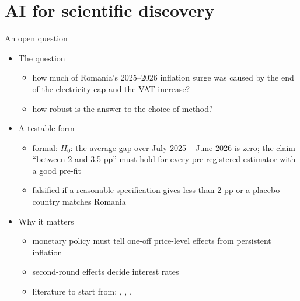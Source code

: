 \section{AI for scientific discovery}

\begin{frame}{An open question}
\itemsize{\small}
\begin{itemize}
    \item The question
    \begin{itemize}
        \item how much of Romania's 2025--2026 inflation surge was caused by the end of the electricity cap and the VAT increase?
        \item how robust is the answer to the choice of method?
    \end{itemize}
    \item A testable form
    \begin{itemize}
        \item formal: $H_0$: the average gap over July 2025 -- June 2026 is zero; the claim ``between 2 and 3.5 pp'' must hold for every pre-registered estimator with a good pre-fit
        \item falsified if a reasonable specification gives less than 2 pp or a placebo country matches Romania
    \end{itemize}
    \item Why it matters
    \begin{itemize}
        \item monetary policy must tell one-off price-level effects from persistent inflation
        \item second-round effects decide interest rates
        \item literature to start from: , , , 
    \end{itemize}
\end{itemize}
\end{frame}

